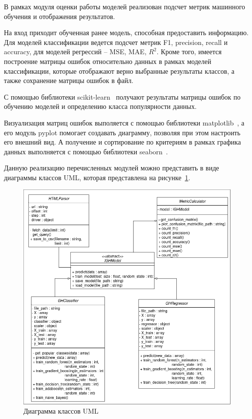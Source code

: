 В рамках модуля оценки работы моделей реализован подсчет метрик машинного обучения и отображения результатов.

На вход приходит обученная ранее модель, способная предоставить информацию. Для моделей классификации ведется подсчет метрик F1, precision, recall и accuracy, для моделей регрессий -- MSE, MAE, $R^2$. Кроме того, имеется построение матрицы ошибок относительно данных в рамках моделей классификации, которые отображают верно выбранные результаты классов, а также сохранение матрицы ошибок в файл.

С помощью библиотеки scikit-learn~\cite{sklearn} получают результаты матрицы ошибок по обучению моделей и определению класса популярности данных.

Визуализация матриц ошибок выполяется с помощью библиотеки matplotlib~\cite{matplotlib}, а его модуль pyplot помогает создавать диаграмму,  позволяя при этом настроить его внешний вид. А получение и сортирование по критериям в рамках графика данных выполняется с помощью библиотеки seaborn~\cite{seaborn}.

Данную реализацию перечисленных модулей можно представить в виде диаграммы классов UML, которая представлена на рисунке~\ref{ris:uml}.
\vspace{1em}

\newpage
\begin{figure}[h]
    \centering
    \includegraphics[width=1\linewidth]{pic/uml.png}
    \vspace{-0.5em}    \caption{Диаграмма классов UML}
    \label{ris:uml}
\end{figure}
\vspace{1em}

